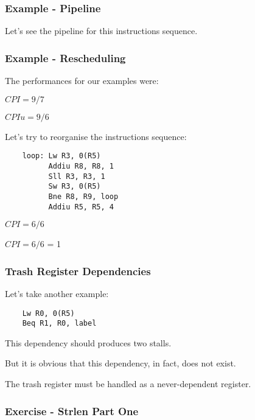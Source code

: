 
\begin{frame}
  \frametitle{Example - Pipeline}

  Let's see the pipeline for this instructions sequence.

  \begin{center}
  \end{center}
\end{frame}


\begin{frame}[containsverbatim]
  \frametitle{Example - Rescheduling}

  The performances for our examples were:

  \-

  $CPI = 9 / 7$

  $CPIu = 9 / 6$

  \-

  Let's try to reorganise the instructions sequence:

  \begin{verbatim}
    loop: Lw R3, 0(R5)
          Addiu R8, R8, 1
          Sll R3, R3, 1
          Sw R3, 0(R5)
          Bne R8, R9, loop
          Addiu R5, R5, 4
  \end{verbatim}

  \-

  $CPI = 6 / 6$

  $CPI = 6 / 6$ \alert{= 1}
\end{frame}


\begin{frame}[containsverbatim]
  \frametitle{Trash Register Dependencies}

  Let's take another example:

  \begin{verbatim}
    Lw R0, 0(R5)
    Beq R1, R0, label
  \end{verbatim}

  This dependency should produces two stalls.

  \-

  But it is obvious that this dependency, in fact, does not exist.

  \-

  The trash register must be handled as a never-dependent register.
\end{frame}


\begin{frame}
  \frametitle{Exercise - Strlen Part One}

  \begin{center}
  \end{center}
\end{frame}

